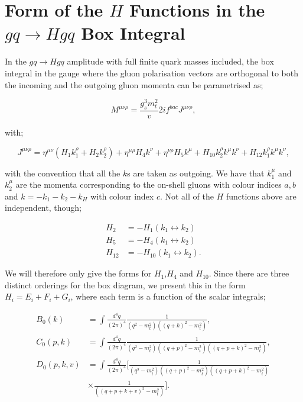 \chapter{Form of the $H$ Functions in the $gq \to Hgq$ Box Integral}
\label{app:boxfunc}

In the $gq \to Hgq$ amplitude with full finite quark masses included, the box integral in the gauge where the gluon polarisation vectors are orthogonal to both the incoming and the outgoing gluon momenta can be parametrised as;

\begin{equation}
M^{\mu \nu \rho} = \frac{g_s^3 m_t^2}{v} 2i f^{bac}J^{\mu \nu \rho},
\end{equation}

with;

\begin{equation}
J^{\mu \nu \rho} = \eta^{\mu \nu}(H_1 k_1^\rho + H_2 k_2^\rho) + \eta^{\mu \rho}H_4 k^\nu + \eta^{\nu \rho}H_5 k^\mu + H_{10}k_2^\rho k^\mu k^\nu + H_{12}k_1^\rho k^\mu k^\nu,
\end{equation}

with the convention that all the $k$s are taken as outgoing. We have that $k_1^\mu$ and $k_2^\mu$ are the momenta corresponding to the on-shell gluons with colour indices $a,b$ and $k = -k_1 -k_2 -k_H$ with colour index $c$. Not all of the $H$ functions above are independent, though;

\begin{equation}
\begin{split}
H_2 &= -H_1(k_1 \leftrightarrow k_2) \\
H_5 &= -H_4(k_1 \leftrightarrow k_2) \\
H_{12} &= -H_{10}(k_1 \leftrightarrow k_2).
\end{split}
\end{equation}

We will therefore only give the forms for $H_1$,$H_4$ and $H_{10}$. Since there are three distinct orderings for the box diagram, we present this in the form $H_i = E_i + F_i + G_i$, where each term is a function of the scalar integrals;

\begin{equation}
\begin{split}
B_0(k) &= \int \frac{d^4 q}{(2 \pi)^4} \frac{1}{(q^2-m_t^2)((q+k)^2-m_t^2)}, \\
C_0(p,k) &= \int \frac{d^4 q}{(2 \pi)^4} \frac{1}{(q^2-m_t^2)((q+p)^2-m_t^2)((q+p+k)^2-m_t^2)}, \\
D_0(p,k,v) &= \int \frac{d^4 q}{(2 \pi)^4} \biggl[ \frac{1}{(q^2-m_t^2)((q+p)^2-m_t^2)((q+p+k)^2-m_t^2)} \\
& \times \frac{1}{((q+p+k+v)^2-m_t^2)} \biggr].
\end{split}
\end{equation}

